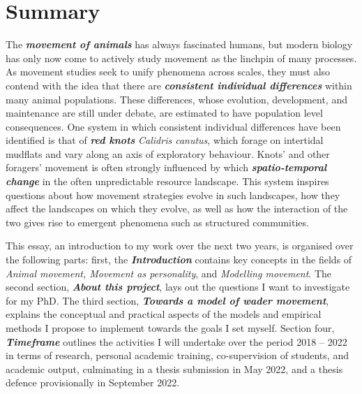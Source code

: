 
\addtolength{\topskip}{0pt plus 10pt}


\part*{Summary}\label{part:Summary}

\setlength{\parindent}{3ex}

The \textbf{\emph{movement of animals}} has always fascinated humans, but modern biology has only now come to actively study movement as the linchpin of many processes. As movement studies seek to unify phenomena across scales, they must also contend with the idea that there are \textbf{\emph{consistent individual differences}} within many animal populations. These differences, whose evolution, development, and maintenance are still under debate, are estimated to have population level consequences.
One system in which consistent individual differences have been identified is that of \textbf{\emph{red knots}} \emph{Calidris canutus}, which forage on intertidal mudflats and vary along an axis of exploratory behaviour. Knots' and other foragers' movement is often strongly influenced by which \textbf{\emph{spatio-temporal change}} in the often unpredictable resource landscape. This system inspires questions about how movement strategies evolve in such landscapes, how they affect the landscapes on which they evolve, as well as how the interaction of the two gives rise to emergent phenomena such as structured communities.

This essay, an introduction to my work over the next two years, is organised over the following parts: first, the \textbf{\emph{Introduction}} contains key concepts in the fields of \emph{Animal movement, Movement as personality}, and \emph{Modelling movement}.
The second section, \textbf{\emph{About this project}}, lays out the questions I want to investigate for my PhD.
The third section, \textbf{\emph{Towards a model of wader movement}}, explains the conceptual and practical aspects of the models and empirical methods I propose to implement towards the goals I set myself. Section four, \textbf{\emph{Timeframe}} outlines the activities I will undertake over the period 2018 -- 2022 in terms of research, personal academic training, co-supervision of students, and academic output, culminating in a thesis submission in May 2022, and a thesis defence provisionally in September 2022.

